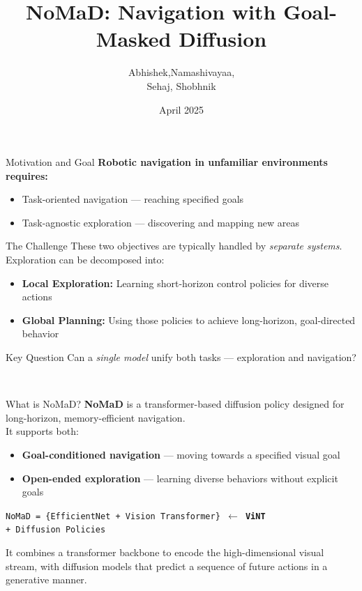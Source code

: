 \documentclass{beamer}
\title[NoMaD]{NoMaD: \textbf{N}avigati\textbf{o}n with Goal-\textbf{Ma}sked \textbf{D}iffusion}
\author{Abhishek,Namashivayaa, \\ Sehaj, Shobhnik}
\institute{IISc Bengaluru \newline BTech. Mathematics and Computing}
\date{April 2025}
\begin{document}
\begin{frame}
\titlepage
\end{frame}

\begin{frame}{Motivation and Goal}
    \textbf{Robotic navigation in unfamiliar environments requires:}
    \begin{itemize}
        \item Task-oriented navigation — reaching specified goals
        \item Task-agnostic exploration — discovering and mapping new areas
    \end{itemize}
    \pause
    \begin{block}{The Challenge}
        These two objectives are typically handled by \textit{separate systems}.\\[1ex]
        Exploration can be decomposed into:
        \begin{itemize}
            \item \textbf{Local Exploration:} Learning short-horizon control policies for diverse actions
            \item \textbf{Global Planning:} Using those policies to achieve long-horizon, goal-directed behavior
        \end{itemize}
    \end{block}
    \pause
    \begin{block}{Key Question}
        Can a \textit{single model} unify both tasks — exploration and navigation?
    \end{block}~
    \end{frame}
    \begin{frame}{What is NoMaD?}
        \textbf{NoMaD} is a transformer-based diffusion policy designed for long-horizon, memory-efficient navigation.\\[0.5em]
        It supports both:
        \begin{itemize}
            \item \textbf{Goal-conditioned navigation} — moving towards a specified visual goal
            \item \textbf{Open-ended exploration} — learning diverse behaviors without explicit goals
        \end{itemize}
        \pause
        \bigskip
        \texttt{NoMaD = \{EfficientNet + Vision Transformer\} $\leftarrow$ \textbf{ViNT} \\+ Diffusion Policies}
        \pause
        \bigskip
        \begin{block}{}
            It combines a transformer backbone to encode the high-dimensional visual stream, with diffusion models that predict a sequence of future actions in a generative manner.
        \end{block}
        \end{frame}
\end{document}
